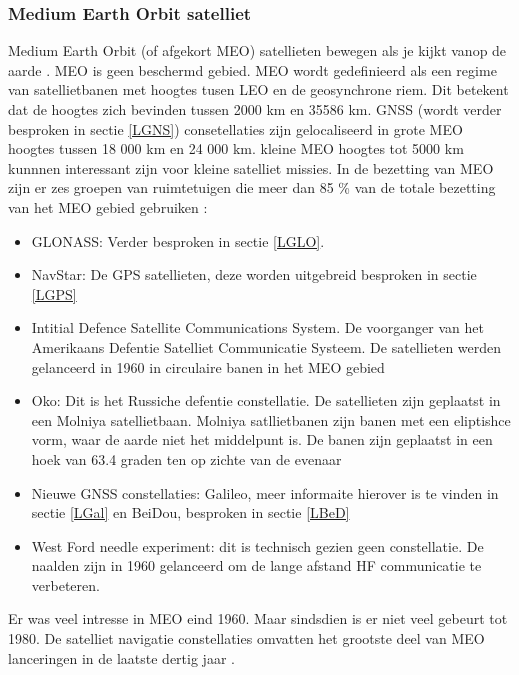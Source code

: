 \subsubsection{Medium Earth Orbit satelliet}
Medium Earth Orbit (of afgekort MEO) satellieten bewegen als je kijkt vanop de aarde \cite{LBibGEO}. MEO is geen beschermd gebied. MEO wordt gedefinieerd als een regime van satellietbanen met hoogtes tusen LEO en de geosynchrone riem. Dit betekent dat de hoogtes zich bevinden tussen 2000 km en 35586 km.  GNSS (wordt verder besproken in sectie \ref{LGNS}) consetellaties zijn gelocaliseerd in grote MEO hoogtes tussen 18 000 km en 24 000 km. kleine MEO hoogtes tot 5000 km kunnnen interessant zijn voor kleine satelliet missies. In de bezetting van MEO zijn er zes groepen van ruimtetuigen die meer dan 85 \% van de totale bezetting van het MEO gebied gebruiken \cite{LBibMEO}:
\begin{itemize}
	\item GLONASS: Verder besproken in sectie \ref{LGLO}. 
	\item NavStar: De GPS satellieten, deze worden uitgebreid besproken in sectie \ref{LGPS}
	\item Intitial Defence Satellite Communications System. De voorganger van het Amerikaans Defentie Satelliet Communicatie Systeem. De satellieten werden gelanceerd in 1960 in circulaire banen in het MEO gebied
	\item  Oko: Dit is het Russiche defentie constellatie. De satellieten zijn geplaatst in een Molniya satellietbaan. Molniya satllietbanen zijn banen met een eliptishce vorm,  waar de aarde niet het middelpunt is. De banen zijn geplaatst in een hoek van 63.4 graden ten op zichte van de evenaar
	\item Nieuwe GNSS constellaties: Galileo, meer informaite hierover is te vinden in sectie \ref{LGal} en BeiDou, besproken in sectie \ref{LBeD}
	\item West Ford needle experiment: dit is technisch gezien geen constellatie. De naalden zijn in 1960 gelanceerd om de lange afstand HF communicatie te verbeteren. 
\end{itemize}
Er was veel intresse in MEO eind 1960. Maar sindsdien is er niet veel gebeurt tot 1980. De satelliet navigatie constellaties omvatten het grootste deel van MEO lanceringen in de laatste dertig jaar \cite{LBibMEO}.

